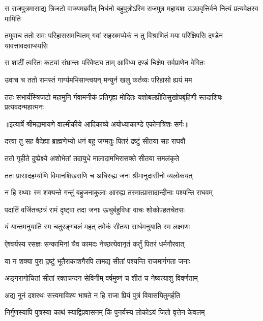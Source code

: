 \threelineshloka
{स राजपुत्रमासाद्य त्रिजटो वाक्यमब्रवीत्}
{निर्धनो बहुपुत्रोऽस्मि राजपुत्र महायशः}
{उञ्छवृत्तिर्वने नित्यं प्रत्यवेक्षस्व मामिति} %

\threelineshloka
{तमुवाच ततो रामः परिहाससमन्वितम्}
{गवां सहस्रमप्येकं न तु विश्राणितं मया}
{परिक्षिपसि दण्डेन यावत्तावदवाप्स्यसि} %

\twolineshloka
{स शाटीं त्वरितः कट्यां संभ्रान्तः परिवेष्ट्य ताम्}
{आविध्य दण्डं चिक्षेप सर्वप्राणेन वेगितः} %

\twolineshloka
{उवाच च ततो रामस्तं गार्ग्यमभिसान्त्वयन्}
{मन्युर्न खलु कर्तव्यः परिहासो ह्ययं मम} %

\fourlineindentedshloka
{ततः सभार्यस्त्रिजटो महामुनि}
{र्गवामनीकं प्रतिगृह्य मोदितः}
{यशोबलप्रीतिसुखोपबृंहिणी}
{स्तदाशिषः प्रत्यवदन्महात्मनः} %


{॥इत्यार्षे श्रीमद्रामायणे वाल्मीकीये आदिकाव्ये अयोध्याकाण्डे एकोनत्रिंशः सर्गः॥}


\twolineshloka
{दत्त्वा तु सह वैदेह्या ब्राह्मणेभ्यो धनं बहु}
{जग्मतुः पितरं द्रष्टुं सीतया सह राघवौ} %

\twolineshloka
{ततो गृहीते दुष्प्रेक्ष्ये अशोभेतां तदायुधे}
{मालादामभिरासक्ते सीतया समलंकृते} %

\twolineshloka
{ततः प्रासादहर्म्याणि विमानशिखराणि च}
{अधिरुह्य जनः श्रीमानुदासीनो व्यलोकयत्} %

\twolineshloka
{न हि रथ्याः स्म शक्यन्ते गन्तुं बहुजनाकुलाः}
{आरुह्य तस्मात्प्रासादान्दीनाः पश्यन्ति राघवम्} %

\twolineshloka
{पदातिं वर्जितच्छत्रं रामं दृष्ट्वा तदा जनाः}
{ऊचुर्बहुविधा वाचः शोकोपहतचेतसः} %

\twolineshloka
{यं यान्तमनुयाति स्म चतुरङ्गबलं महत्}
{तमेकं सीतया सार्धमनुयाति स्म लक्ष्मणः} %

\twolineshloka
{ऐश्वर्यस्य रसज्ञः सन्कामिनां चैव कामदः}
{नेच्छत्येवानृतं कर्तुं पितरं धर्मगौरवात्} %

\twolineshloka
{या न शक्या पुरा द्रष्टुं भूतैराकाशगैरपि}
{तामद्य सीतां पश्यन्ति राजमार्गगता जनाः} %

\twolineshloka
{अङ्गरागोचितां सीतां रक्तचन्दन सेविनीम्}
{वर्षमुष्णं च शीतं च नेष्यत्याशु विवर्णताम्} %

\twolineshloka
{अद्य नूनं दशरथः सत्त्वमाविश्य भाषते}
{न हि राजा प्रियं पुत्रं विवासयितुमर्हति} %

\twolineshloka
{निर्गुणस्यापि पुत्रस्या काथं स्याद्विप्रवासनम्}
{किं पुनर्यस्य लोकोऽयं जितो वृत्तेन केवलम्} %

